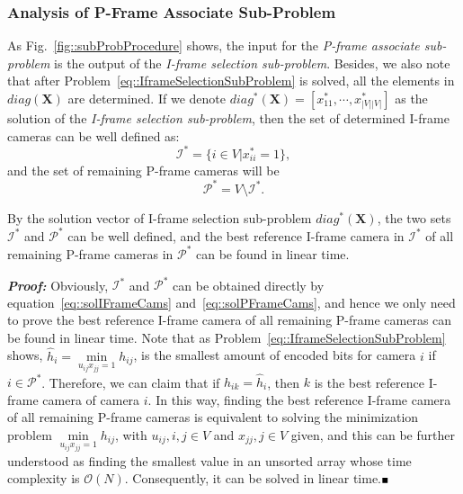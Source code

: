 \subsubsection{Analysis of P-Frame Associate Sub-Problem}
\label{sec::PFrameScheduling}
As Fig.~\ref{fig::subProbProcedure} shows, the input for the \emph{P-frame associate sub-problem} is the output of the \emph{I-frame selection sub-problem}.
Besides, we also note that after Problem~\eqref{eq::IframeSelectionSubProblem} is solved, all the elements in $diag(\mathbf{X})$ are determined.
If we denote ${diag^*(\mathbf{X}) = \left[ x_{11}^*, \cdots, x_{|V||V|}^* \right]}$ as the solution of the \emph{I-frame selection sub-problem}, then the set of determined I-frame cameras can be well defined as:
\begin{equation}
\mathcal{I}^* = \{ i \in V | x_{ii}^* = 1\},
\label{eq::solIFrameCams}
\end{equation}
and the set of remaining P-frame cameras will be
\begin{equation}
\mathcal{P}^* = V \setminus \mathcal{I}^*.
\label{eq::solPFrameCams}
\end{equation} 
%
\begin{mylem}
By the solution vector of I-frame selection sub-problem $diag^*(\mathbf{X})$, the two sets $\mathcal{I}^*$ and $\mathcal{P}^*$ can be well defined, and the best reference I-frame camera in $\mathcal{I}^*$ of all remaining P-frame cameras in $\mathcal{P}^*$ can be found in linear time.
\label{lemma::findBestICamEasy}
\end{mylem}
\textbf{\emph{Proof:}}
Obviously, $\mathcal{I}^*$ and $\mathcal{P}^*$ can be obtained directly by equation~\eqref{eq::solIFrameCams} and~\eqref{eq::solPFrameCams}, and hence we only need to prove the best reference I-frame camera of all remaining P-frame cameras can be found in linear time.
Note that as Problem~\eqref{eq::IframeSelectionSubProblem} shows, ${\hat{h}_i = \underset{u_{ij}x_{jj} = 1}{\min} h_{ij}}$, is the smallest amount of encoded bits for camera $i$ if $i \in \mathcal{P}^*$.
Therefore, we can claim that if $h_{ik} = \hat{h}_i$, then $k$ is the best reference I-frame camera of camera $i$.
In this way, finding the best reference I-frame camera of all remaining P-frame cameras is equivalent to solving the minimization problem ${\underset{u_{ij}x_{jj} = 1}{\min} h_{ij}}$, with ${u_{ij}, i,j \in V}$ and ${x_{jj}, j \in V}$ given, and this can be further understood as finding the smallest value in an unsorted array whose time complexity is $\mathcal{O}(N)$.
Consequently, it can be solved in linear time.\hfill$\mathsmaller{\mathsmaller{\blacksquare}}$

